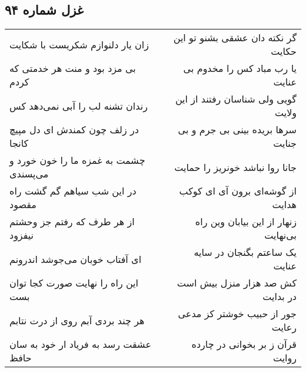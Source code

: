\begin{center}
\section*{غزل شماره ۹۴}
\label{sec:sh094}
\begin{longtable}{l p{0.5cm} r}
زان یار دلنوازم شکریست با شکایت
&&
گر نکته دان عشقی بشنو تو این حکایت
\\
بی مزد بود و منت هر خدمتی که کردم
&&
یا رب مباد کس را مخدوم بی عنایت
\\
رندان تشنه لب را آبی نمی‌دهد کس
&&
گویی ولی شناسان رفتند از این ولایت
\\
در زلف چون کمندش ای دل مپیچ کانجا
&&
سرها بریده بینی بی جرم و بی جنایت
\\
چشمت به غمزه ما را خون خورد و می‌پسندی
&&
جانا روا نباشد خونریز را حمایت
\\
در این شب سیاهم گم گشت راه مقصود
&&
از گوشه‌ای برون آی ای کوکب هدایت
\\
از هر طرف که رفتم جز وحشتم نیفزود
&&
زنهار از این بیابان وین راه بی‌نهایت
\\
ای آفتاب خوبان می‌جوشد اندرونم
&&
یک ساعتم بگنجان در سایه عنایت
\\
این راه را نهایت صورت کجا توان بست
&&
کش صد هزار منزل بیش است در بدایت
\\
هر چند بردی آبم روی از درت نتابم
&&
جور از حبیب خوشتر کز مدعی رعایت
\\
عشقت رسد به فریاد ار خود به سان حافظ
&&
قرآن ز بر بخوانی در چارده روایت
\\
\end{longtable}
\end{center}
